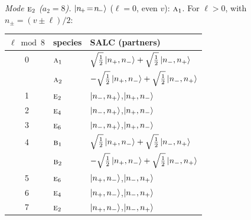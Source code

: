 \documentclass[11pt]{article}
\newcommand{\irr}[1]{\text{\normalfont\scshape #1}}
\begin{document}
\emph{Mode $\irr{e}_{2}$ ($a_2=8$).} $\ket{n_{\!+}\!=\!n_{\!-}}$ ($\ell=0$, even $v$): $\irr{a}_{1}$. For $\ell>0$, with $n_\pm=(v\pm\ell)/2$:
\begin{longtable}{c l l}\hline $\ell\bmod 8$ & species & SALC (partners)\\ \hline\endhead
0 & $\irr{a}_{1}$ & $\sqrt{\tfrac{1}{2}}\ket{n_+,n_-}+\sqrt{\tfrac{1}{2}}\ket{n_-,n_+}$\\
 & $\irr{a}_{2}$ & $-\sqrt{\tfrac{1}{2}}\ket{n_+,n_-}+\sqrt{\tfrac{1}{2}}\ket{n_-,n_+}$\\
1 & $\irr{e}_{2}$ & $\ket{n_-,n_+}$,\quad $\ket{n_+,n_-}$\\
2 & $\irr{e}_{4}$ & $\ket{n_-,n_+}$,\quad $\ket{n_+,n_-}$\\
3 & $\irr{e}_{6}$ & $\ket{n_-,n_+}$,\quad $\ket{n_+,n_-}$\\
4 & $\irr{b}_{1}$ & $\sqrt{\tfrac{1}{2}}\ket{n_+,n_-}+\sqrt{\tfrac{1}{2}}\ket{n_-,n_+}$\\
 & $\irr{b}_{2}$ & $-\sqrt{\tfrac{1}{2}}\ket{n_+,n_-}+\sqrt{\tfrac{1}{2}}\ket{n_-,n_+}$\\
5 & $\irr{e}_{6}$ & $\ket{n_+,n_-}$,\quad $\ket{n_-,n_+}$\\
6 & $\irr{e}_{4}$ & $\ket{n_+,n_-}$,\quad $\ket{n_-,n_+}$\\
7 & $\irr{e}_{2}$ & $\ket{n_+,n_-}$,\quad $\ket{n_-,n_+}$\\
\hline\end{longtable}
\end{document}

